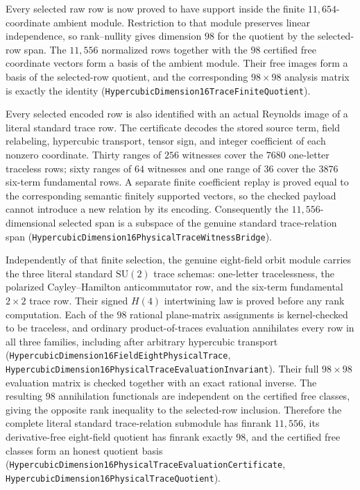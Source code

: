 \documentclass[11pt]{article}
\theoremstyle{definition}
\begin{document}
Every selected raw row is now proved to have support inside the finite
$11{,}654$-coordinate ambient module.  Restriction to that module preserves
linear independence, so rank--nullity gives dimension $98$ for the quotient by
the selected-row span.  The $11{,}556$ normalized rows together with the $98$
certified free coordinate vectors form a basis of the ambient module.  Their
free images form a basis of the selected-row quotient, and the corresponding
$98\times98$ analysis matrix is exactly the identity
(\texttt{HypercubicDimension16TraceFiniteQuotient}).

Every selected encoded row is also identified with an actual Reynolds image
of a literal standard trace row.  The certificate decodes the stored source
term, field relabeling, hypercubic transport, tensor sign, and integer
coefficient of each nonzero coordinate.  Thirty ranges of $256$ witnesses
cover the $7680$ one-letter traceless rows; sixty ranges of $64$ witnesses and
one range of $36$ cover the $3876$ six-term fundamental rows.  A separate
finite coefficient replay is proved equal to the corresponding semantic
finitely supported vectors, so the checked payload cannot introduce a new
relation by its encoding.  Consequently the $11{,}556$-dimensional selected
span is a subspace of the genuine standard trace-relation span
(\texttt{HypercubicDimension16PhysicalTraceWitnessBridge}).

Independently of that finite selection, the genuine eight-field orbit module
carries the three literal standard $\mathrm{SU}(2)$ trace schemas:
one-letter tracelessness, the polarized Cayley--Hamilton anticommutator row,
and the six-term fundamental $2\times2$ trace row.  Their signed $H(4)$
intertwining law is proved before any rank computation.  Each of the $98$
rational plane-matrix assignments is kernel-checked to be traceless, and
ordinary product-of-traces evaluation annihilates every row in all three
families, including after arbitrary hypercubic transport
(\texttt{HypercubicDimension16FieldEightPhysicalTrace},
\texttt{HypercubicDimension16PhysicalTraceEvaluationInvariant}).  Their
full $98\times98$ evaluation matrix is checked together with an
exact rational inverse.  The resulting $98$ annihilation functionals are
independent on the certified free classes, giving the opposite rank
inequality to the selected-row inclusion.  Therefore the complete literal
standard trace-relation submodule has finrank $11{,}556$, its derivative-free
eight-field quotient has finrank exactly $98$, and the certified free classes
form an honest quotient basis
(\texttt{HypercubicDimension16PhysicalTraceEvaluationCertificate},
\texttt{HypercubicDimension16PhysicalTraceQuotient}).
\end{document}
